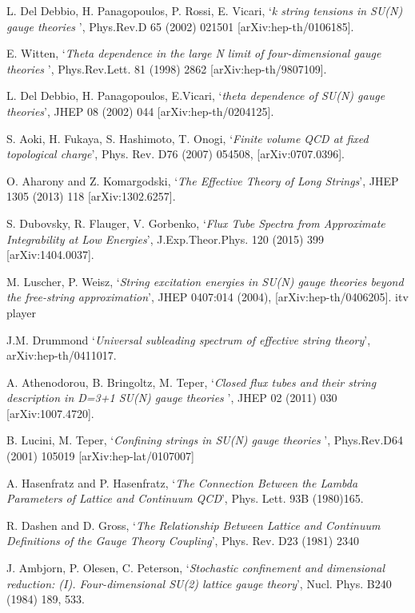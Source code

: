 \documentclass[12pt]{article}
\begin{document}
\begin{thebibliography}{99}
  L. Del Debbio, H. Panagopoulos, P. Rossi, E. Vicari,
  `{\it k string tensions in SU(N) gauge theories }',
 Phys.Rev.D 65 (2002) 021501 [arXiv:hep-th/0106185].


  E. Witten,
  `{\it Theta dependence in the large N limit of four-dimensional gauge theories }',
  Phys.Rev.Lett. 81 (1998) 2862 [arXiv:hep-th/9807109].
  

  L. Del Debbio, H. Panagopoulos, E.Vicari,
  `{\it theta dependence of SU(N) gauge theories}',
  JHEP 08 (2002) 044 [arXiv:hep-th/0204125].

  S. Aoki, H. Fukaya, S. Hashimoto, T. Onogi,
  `{\it Finite volume QCD at fixed topological charge}',
  Phys. Rev. D76 (2007) 054508, [arXiv:0707.0396].
  
  O. Aharony and Z. Komargodski,
  `{\it The Effective Theory of Long Strings}',
  JHEP 1305 (2013) 118 [arXiv:1302.6257].

  S. Dubovsky, R. Flauger, V. Gorbenko,
  `{\it Flux Tube Spectra from Approximate Integrability at Low Energies}',
  J.Exp.Theor.Phys. 120 (2015) 399 [arXiv:1404.0037].

  M. Luscher, P. Weisz,
  `{\it String excitation energies in SU(N) gauge theories beyond the free-string approximation}',
  JHEP 0407:014 (2004), [arXiv:hep-th/0406205].
  itv player
  
  J.M. Drummond
  `{\it Universal subleading spectrum of effective string theory}',
  arXiv:hep-th/0411017.

  A. Athenodorou, B. Bringoltz, M. Teper,
  `{\it Closed flux tubes and their string description in D=3+1 SU(N) gauge theories }',
  JHEP 02 (2011) 030 [arXiv:1007.4720].

  B. Lucini, M. Teper,
  `{\it Confining strings in SU(N) gauge theories }',
  Phys.Rev.D64 (2001) 105019 [arXiv:hep-lat/0107007]


  A. Hasenfratz and P. Hasenfratz,
  `{\it The Connection Between the Lambda Parameters of Lattice and Continuum QCD}',
  Phys. Lett. 93B (1980)165.

  
  R. Dashen and D. Gross,
`{\it The Relationship Between Lattice and Continuum Definitions of the Gauge Theory Coupling}',
  Phys. Rev. D23 (1981) 2340

  J. Ambjorn, P. Olesen, C. Peterson,
  `{\it Stochastic confinement and dimensional reduction: (I). Four-dimensional SU(2) lattice gauge theory}',
  Nucl. Phys. B240 (1984) 189, 533.
    

\end{thebibliography}
\end{document}
